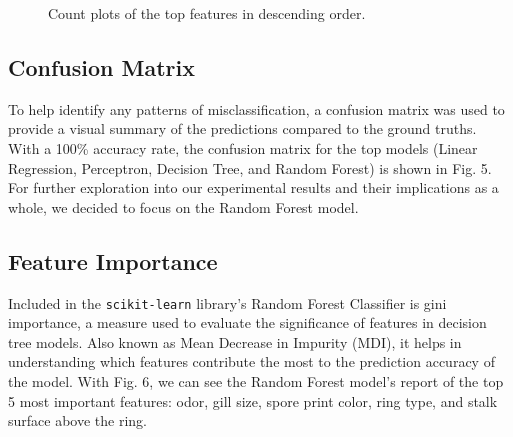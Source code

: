 \documentclass[11pt, conference]{IEEEtran}
\begin{document}
    \begin{figure}[htbp] \ContinuedFloat
        \caption{Count plots of the top features in descending order.}
        \label{fig:graphic3}  
    \end{figure}

    \subsection{Confusion Matrix}
    To help identify any patterns of misclassification, a confusion matrix was used to provide a visual summary of the predictions compared to the ground truths. With a 100\% accuracy rate, the confusion matrix for the top models (Linear Regression, Perceptron, Decision Tree, and Random Forest) is shown in Fig. 5. For further exploration into our experimental results and their implications as a whole, we decided to focus on the Random Forest model.

    \subsection{Feature Importance}
    Included in the \texttt{scikit-learn} library's Random Forest Classifier is gini importance, a measure used to evaluate the significance of features in decision tree models. Also known as Mean Decrease in Impurity (MDI), it helps in understanding which features contribute the most to the prediction accuracy of the model. With Fig. 6, we can see the Random Forest model's report of the top 5 most important features: odor, gill size, spore print color, ring type, and stalk surface above the ring.
\end{document}
